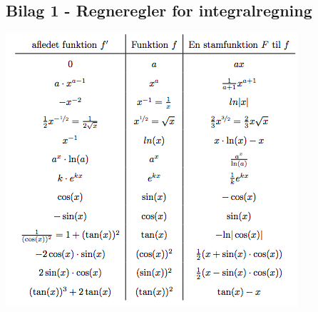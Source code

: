 \documentclass[12pt]{article}
\numberwithin{equation}{section}
\begin{document}
\subsection{Bilag 1 - Regneregler for integralregning}
\begin{center}
	\includegraphics[width=0.9\linewidth]{Billeder/Integralregneregler}
\end{center}
\end{document}
